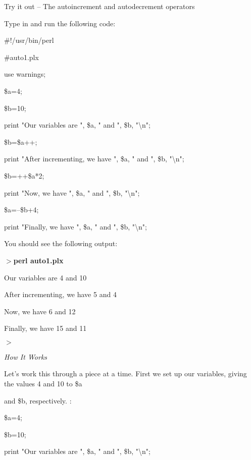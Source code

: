\documentclass[a4paper,11pt]{book}
\begin{document}
\noindent 

\noindent Try it out -- The autoincrement and autodecrement operators

\noindent Type in and run the following code:

\noindent 

\noindent 

\noindent \#!/usr/bin/perl

\noindent \#auto1.plx

\noindent use warnings;

\noindent \$a=4;

\noindent \$b=10;

\noindent print "Our variables are ", \$a, " and ", \$b, "\textbackslash n";

\noindent \$b=\$a++;

\noindent print "After incrementing, we have ", \$a, " and ", \$b, "\textbackslash n";

\noindent \$b=++\$a*2;

\noindent print "Now, we have ", \$a, " and ", \$b, "\textbackslash n";

\noindent \$a=--\$b+4;

\noindent print "Finally, we have ", \$a, " and ", \$b, "\textbackslash n";

\noindent 

\noindent You should see the following output:

\noindent 

\noindent $>$\textbf{perl auto1.plx}

\noindent Our variables are 4 and 10

\noindent After incrementing, we have 5 and 4

\noindent Now, we have 6 and 12

\noindent Finally, we have 15 and 11

\noindent $>$

\noindent 

\noindent \textit{How It Works}

\noindent Let's work this through a piece at a time. First we set up our variables, giving the values 4 and 10 to \$a

\noindent and \$b, respectively. :

\noindent 

\noindent 

\noindent \$a=4;

\noindent \$b=10;

\noindent print "Our variables are ", \$a, " and ", \$b, "\textbackslash n";
\end{document}
